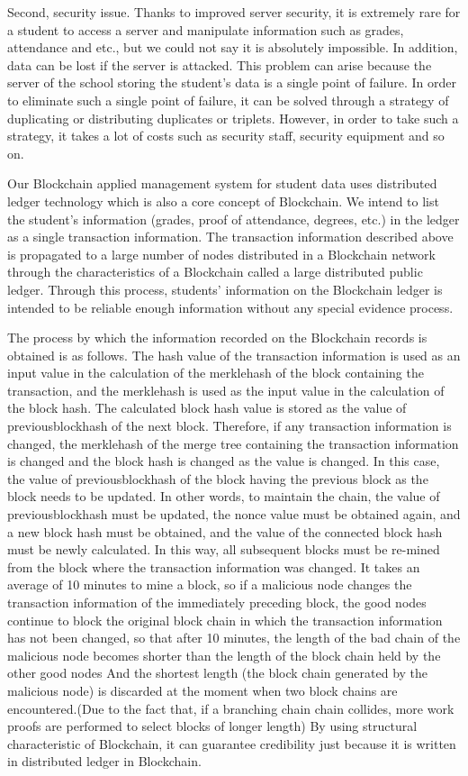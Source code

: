 \documentclass[conference]{IEEEtran}
\begin{document}
Second, security issue. Thanks to improved server security, it is extremely rare for a student to access a server and manipulate information such as grades, attendance and etc., but we could not say it is absolutely impossible.
In addition, data can be lost if the server is attacked. This problem can arise because the server of the school storing the student's data is a single point of failure. In order to eliminate such a single point of failure, it can be solved through a strategy of duplicating or distributing duplicates or triplets. However, in order to take such a strategy, it takes a lot of costs such as security staff, security equipment and so on. 

Our Blockchain applied management system for student data uses distributed ledger technology which is also a core concept of Blockchain. We intend to list the student's information (grades, proof of attendance, degrees, etc.) in the ledger as a single transaction information. The transaction information described above is propagated to a large number of nodes distributed in a Blockchain network through the characteristics of a Blockchain called a large distributed public ledger. Through this process, students' information on the Blockchain ledger is intended to be reliable enough information without any special evidence process. 

The process by which the information recorded on the Blockchain records is obtained is as follows. The hash value of the transaction information is used as an input value in the calculation of the merklehash of the block containing the transaction, and the merklehash is used as the input value in the calculation of the block hash. The calculated block hash value is stored as the value of previousblockhash of the next block. Therefore, if any transaction information is changed, the merklehash of the merge tree containing the transaction information is changed and the block hash is changed as the value is changed. In this case, the value of previousblockhash of the block having the previous block as the block needs to be updated. In other words, to maintain the chain, the value of previousblockhash must be updated, the nonce value must be obtained again, and a new block hash must be obtained, and the value of the connected block hash must be newly calculated. In this way, all subsequent blocks must be re-mined from the block where the transaction information was changed. It takes an average of 10 minutes to mine a block, so if a malicious node changes the transaction information of the immediately preceding block, the good nodes continue to block the original block chain in which the transaction information has not been changed, so that after 10 minutes, the length of the bad chain of the malicious node becomes shorter than the length of the block chain held by the other good nodes And the shortest length (the block chain generated by the malicious node) is discarded at the moment when two block chains are encountered.(Due to the fact that, if a branching chain chain collides, more work proofs are performed to select blocks of longer length) By using structural characteristic of Blockchain, it can guarantee credibility just because it is written in distributed ledger in Blockchain. 
\end{document}
